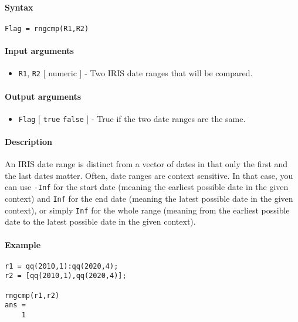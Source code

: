 


	\paragraph{Syntax}

\begin{verbatim}
Flag = rngcmp(R1,R2)
\end{verbatim}

\paragraph{Input arguments}

\begin{itemize}
\itemsep1pt\parskip0pt
\item
  \texttt{R1}, \texttt{R2} {[} numeric {]} - Two IRIS date ranges that
  will be compared.
\end{itemize}

\paragraph{Output arguments}

\begin{itemize}
\itemsep1pt\parskip0pt
\item
  \texttt{Flag} {[} \texttt{true} \textbar{} \texttt{false} {]} - True
  if the two date ranges are the same.
\end{itemize}

\paragraph{Description}

An IRIS date range is distinct from a vector of dates in that only the
first and the last dates matter. Often, date ranges are context
sensitive. In that case, you can use \texttt{-Inf} for the start date
(meaning the earliest possible date in the given context) and
\texttt{Inf} for the end date (meaning the latest possible date in the
given context), or simply \texttt{Inf} for the whole range (meaning from
the earliest possible date to the latest possible date in the given
context).

\paragraph{Example}

\begin{verbatim}
r1 = qq(2010,1):qq(2020,4);
r2 = [qq(2010,1),qq(2020,4)];

rngcmp(r1,r2)
ans =
    1
\end{verbatim}


